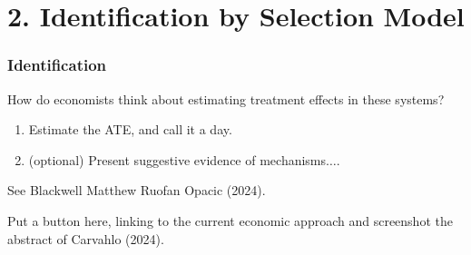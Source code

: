 \documentclass[dvipsnames,handout]{beamer} %
\begin{document}
\section{2. Identification by Selection Model}
\begin{frame}
    \frametitle{Identification}
    How do economists think about estimating treatment effects in these systems?
    \begin{enumerate}
        \item Estimate the ATE, and call it a day.
        \item (optional) Present suggestive evidence of mechanisms$\hdots$.
    \end{enumerate}

    See Blackwell Matthew Ruofan Opacic (2024).

    Put a button here, linking to the current economic approach and screenshot the abstract of Carvahlo (2024).
\end{frame}
\end{document}
